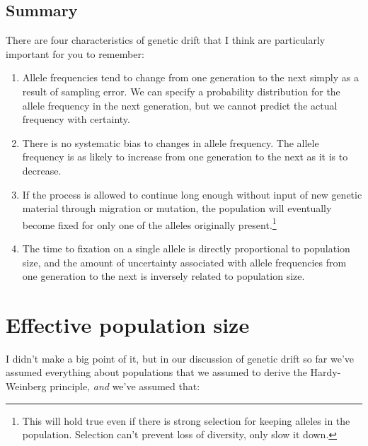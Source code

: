\subsection*{Summary}

There are four characteristics of genetic drift that I think are
particularly important for you to remember:

\begin{enumerate}

\item Allele frequencies tend to change from one generation to the
next simply as a result of sampling error. We can specify a
probability distribution for the allele frequency in the next
generation, but we cannot predict the actual frequency with certainty.

\item There is no systematic bias to changes in allele frequency. The
allele frequency is as likely to increase from one generation to the
next as it is to decrease.

\item If the process is allowed to continue long enough without input
of new genetic material through migration or mutation, the population
will eventually become fixed for only one of the alleles originally
present.\footnote{This will hold true even if there is strong
selection for keeping alleles in the population. Selection can't
prevent loss of diversity, only slow it down.}

\item The time to fixation on a single allele is directly proportional
to population size, and the amount of uncertainty associated with
allele frequencies from one generation to the next is inversely
related to population size.

\end{enumerate}

\section*{Effective population size}

I didn't make a big point of it, but in our discussion of genetic
drift so far we've assumed everything about populations that we
assumed to derive the Hardy-Weinberg principle, {\it and\/} we've
assumed that:

